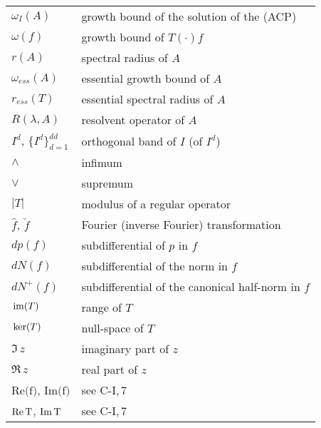 \begin{longtable}{p{}p{}}
$\omega_I(A)$ & growth bound of the solution of the (ACP) \\ %
$\omega(f)$ & growth bound of $T(\cdot)f$ \\ %
$r(A)$ & spectral radius of $A$\\ %
$\omega_{ess}(A)$ & essential growth bound of $A$\\ %
$r_{ess}(T)$ & essential spectral radius of $A$\\ %
$R(\lambda,A)$ & resolvent operator of $A$\\ %
$I^{d}$, $\{I^{d}\}_{d=1}^{dd}$ & orthogonal band of $I$ (of $I^{d}$) \\ %
$\wedge$ & infimum \\ %
$\vee$ & supremum \\ %
$|T|$ & modulus of a regular operator \\ %
$\hat{f}$, $\check{f}$ & Fourier (inverse Fourier) transformation \\ %
$dp(f)$ & subdifferential of $p$ in $f$ \\ %
$dN(f)$ & subdifferential of the norm in $f$ \\ %
$dN^{+}(f)$ & subdifferential of the canonical half-norm in $f$ \\ %
$\mathop{}\mathrm{im}(T)$ & range of $T$\\ %
$\mathop{}\mathrm{ker}(T)$ & null-space of $T$\\ %
$\Im \, z$ & imaginary part of $z$ \\ %
$\Re \, z$ & real part of $z$\\ %
$\text{Re(f)}$, $\text{Im(f)}$ &  see C-I,\,7 \\ %
$\text{Re\,T}$, $\text{Im\,T}$ & see C-I,\,7 \\ %

\end{longtable}
